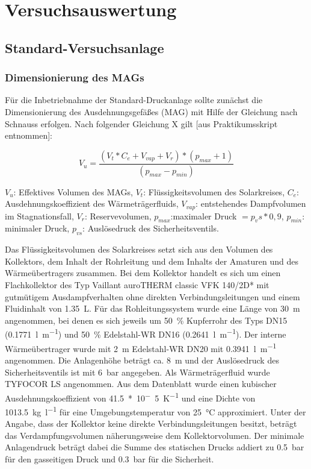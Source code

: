\section{Versuchsauswertung}

\subsection{Standard-Versuchsanlage} 

\subsubsection{Dimensionierung des MAGs}
Für die Inbetriebnahme der Standard-Druckanlage sollte zunächst die Dimensionierung des Ausdehnungsgefäßes (MAG) mit Hilfe der Gleichung nach Schnauss erfolgen.  Nach folgender Gleichung X gilt [aus Praktikumsskript entnommen]: 

\begin{equation}
\label{eq:eff.VolMAG}
V_u= \frac{(V_t * C_e + V_{vap} + V_r)*(p_{max} + 1)}{(p_{max}-p_{min})}
\end{equation}

\begin{center}
	\begin{small}
		$V_u$: Effektives Volumen des MAGs,
		$V_t$: Flüssigkeitsvolumen des Solarkreises,
		$C_e$: Ausdehnungskoeffizient des Wärmeträgerfluids,
		$V_{vap}$: entstehendes Dampfvolumen im Stagnationsfall,
		$V_r$: Reservevolumen,
		$p_{max}$:maximaler Druck $=p_vs*0,9$,
		$p_{min}$: minimaler Druck,
		$p_{vs}$: Auslösedruck des Sicherheitsventils.
	\end{small}
\end{center}

Das Flüssigkeitsvolumen des Solarkreises setzt sich aus den Volumen des Kollektors, dem Inhalt der Rohrleitung und dem Inhalts der Amaturen und des Wärmeübertragers zusammen. Bei dem Kollektor handelt es sich um einen Flachkollektor des Typ Vaillant auroTHERM classic VFK 140/2D* mit gutmütigem Ausdampfverhalten ohne direkten Verbindungsleitungen und einem Fluidinhalt von \SI{1,35}{\liter}. Für das Rohleitungssystem wurde eine Länge von \SI{30}{\metre} angenommen, bei denen es sich jeweils um \SI{50}{\percent} Kupferrohr des Typs DN15 (\SI{0,1771}{\litre\per\metre}) und \SI{50}{\percent} Edelstahl-WR DN16 (\SI{0,2641}{\litre\per\metre}). Der interne Wärmeübertrager wurde mit \SI{2}{\metre} Edelstahl-WR DN20 mit \SI{0,3941}{\litre\per\metre} angenommen. Die Anlagenhöhe beträgt ca. \SI{8}{\metre} und der Auslösedruck des Sicherheitsventils ist mit \SI{6}{\bar} angegeben. Als Wärmeträgerfluid wurde TYFOCOR LS angenommen. Aus dem Datenblatt wurde einen kubischer Ausdehnungskoeffizient von \SI{41,5}{*10^-5\per\kelvin} und eine Dichte von \SI{1013,5}{\kg\per\litre} für eine Umgebungstemperatur von \SI{25}{\celsius} approximiert. Unter der Angabe, dass der Kollektor keine direkte Verbindungsleitungen besitzt, beträgt das Verdampfungsvolumen näherungsweise dem Kollektorvolumen. Der minimale Anlagendruck beträgt dabei die Summe des statischen Drucks addiert zu \SI{0,5}{\bar} für den gasseitigen Druck und \SI{0,3}{\bar} für die Sicherheit. 

